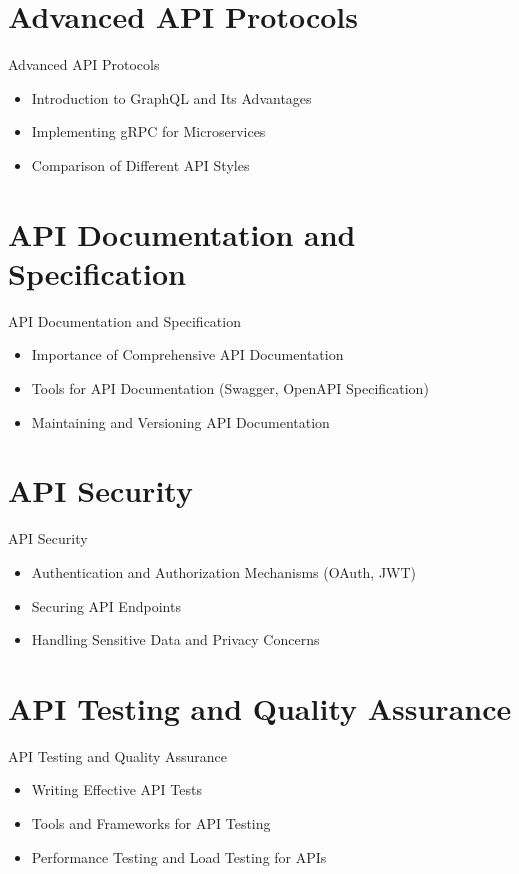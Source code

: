 \documentclass{beamer}
\begin{document}
\section{Advanced API Protocols}
\begin{frame}{Advanced API Protocols}
  \begin{itemize}
    \item Introduction to GraphQL and Its Advantages
    \item Implementing gRPC for Microservices
    \item Comparison of Different API Styles
  \end{itemize}
\end{frame}

\section{API Documentation and Specification}
\begin{frame}{API Documentation and Specification}
  \begin{itemize}
    \item Importance of Comprehensive API Documentation
    \item Tools for API Documentation (Swagger, OpenAPI Specification)
    \item Maintaining and Versioning API Documentation
  \end{itemize}
\end{frame}

\section{API Security}
\begin{frame}{API Security}
  \begin{itemize}
    \item Authentication and Authorization Mechanisms (OAuth, JWT)
    \item Securing API Endpoints
    \item Handling Sensitive Data and Privacy Concerns
  \end{itemize}
\end{frame}

\section{API Testing and Quality Assurance}
\begin{frame}{API Testing and Quality Assurance}
  \begin{itemize}
    \item Writing Effective API Tests
    \item Tools and Frameworks for API Testing
    \item Performance Testing and Load Testing for APIs
  \end{itemize}
\end{frame}
\end{document}
